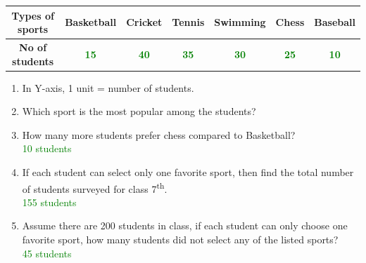 \documentclass[a4paper,12pt]{article}
\newcommand{\ans}[1]{\underline{\makebox[1.5cm][c]{\textcolor{green}{#1}}}}
\begin{document}
{\begin{minipage}{\dimexpr\textwidth-2\fboxsep-2\fboxrule\relax}
\begin{center}
  \end{center}
   \begin{center}
	\renewcommand{\arraystretch}{1.5}
	\begin{tabular}{|c|c|c|c|c|c|c|}
		\hline
		\textbf{Types of sports} & Basketball & Cricket & Tennis & Swimming & Chess & Baseball \\
		\hline
		\textbf{No of students} & 
		\textcolor{green}{\textbf{15}} & 
		\textcolor{green}{\textbf{40}} & 
		\textcolor{green}{\textbf{35}} & 
		\textcolor{green}{\textbf{30}} & 
		\textcolor{green}{\textbf{25}} & 
		\textcolor{green}{\textbf{10}} \\
		\hline
	\end{tabular}
    \end{center}
    \vspace{0.3cm}
    \begin{enumerate}
    	\item In Y-axis, 1 unit = \ans{5} number of students.
    	\item Which sport is the most popular among the students? \ans{Cricket}
    	\item How many more students prefer chess compared to Basketball? \\
        \textcolor{green}{10 students}
    	\item If each student can select only one favorite sport, then find the total number of students surveyed for class 7\textsuperscript{th}. \\
        \textcolor{green}{155 students}
    	\item Assume there are 200 students in class, if each student can only choose one favorite sport, how many students did not select any of the listed sports? \\ 
        \textcolor{green}{45 students}
    \end{enumerate}
\end{minipage}
}
\newpage
\end{document}

